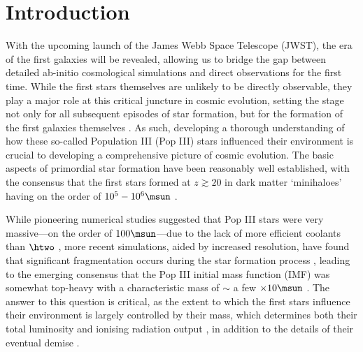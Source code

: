 \section{Introduction}
\label{intro}

With the upcoming launch of the James Webb Space Telescope (JWST), the era of the first galaxies will be revealed, allowing us to bridge the gap between detailed ab-initio cosmological simulations and direct observations for the first time. While the first stars themselves are unlikely to be directly observable, they play a major role at this critical juncture in cosmic evolution, setting the stage not only for all subsequent episodes of star formation, but for the formation of the first galaxies themselves \citep{BarkanaLoeb2001,Miralda-Escude2003,Brommetal2009,Loeb2010,Bromm2013}.  As such, developing a thorough understanding of how these so-called Population III (Pop III) stars influenced their environment is crucial to developing a comprehensive picture of cosmic evolution. The basic aspects of primordial star formation have been reasonably well established, with the consensus that the first stars formed at $z\gtrsim20$ in dark matter `minihaloes' having on the order of $10^5 - 10^6\msun$ \citep{CouchmanRees1986,HaimanThoulLoeb1996,Tegmarketal1997}. 

While pioneering numerical studies suggested that Pop III stars were very massive---on the order of $100\msun$---due to the lack of more efficient coolants than $\htwo$ \citep[e.g.,][]{BrommCoppiLarson1999, BrommCoppiLarson2002, AbelBryanNorman2002, Yoshidaetal2003, BrommLarson2004, Yoshidaetal2006, O'SheaNorman2007}, more recent simulations, aided by increased resolution, have found that significant fragmentation occurs during the star formation process \citep{StacyGreifBromm2010,Clarketal2011a,Clarketal2011b,Greifetal2011,Greifetal2012,StacyBromm2013,Hiranoetal2014}, leading to the emerging consensus that the Pop III initial mass function (IMF) was somewhat top-heavy with a characteristic mass of $\sim$ a few $\times 10\msun$ \citep{Bromm2013}.  The answer to this question is critical, as the extent to which the first stars influence their environment is largely controlled by their mass, which determines both their total luminosity and ionising radiation output \citep{Schaerer2002}, in addition to the details of their eventual demise \citep{Hegeretal2003,HegerWoosley2010,MaederMeynet2012}.

